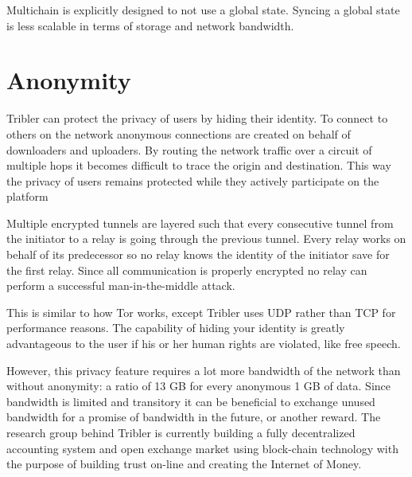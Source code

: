 Multichain is explicitly designed to not use a global state.
Syncing a global state is less scalable in terms of storage and network bandwidth.


\section{Anonymity}

Tribler can protect the privacy of users by hiding their identity.
To connect to others on the network anonymous connections are created on behalf of downloaders and uploaders.
By routing the network traffic over a circuit of multiple hops it becomes difficult to trace the origin and destination.
This way the privacy of users remains protected while they actively participate on the platform

Multiple encrypted tunnels are layered such that every consecutive tunnel from the initiator to a relay is going through the previous tunnel.
Every relay works on behalf of its predecessor so no relay knows the identity of the initiator save for the first relay.
Since all communication is properly encrypted no relay can perform a successful man-in-the-middle attack.

This is similar to how Tor works, except Tribler uses UDP rather than TCP for performance reasons.
The capability of hiding your identity is greatly advantageous to the user if his or her human rights are violated, like free speech.

However, this privacy feature requires a lot more bandwidth of the network than without anonymity: a ratio of 13 GB for every anonymous 1 GB of data.
Since bandwidth is limited and transitory it can be beneficial to exchange unused bandwidth for a promise of bandwidth in the future, or another reward.
The research group behind Tribler is currently building a fully decentralized accounting system and open exchange market using block-chain technology with the purpose of building trust on-line and creating the Internet of Money.

